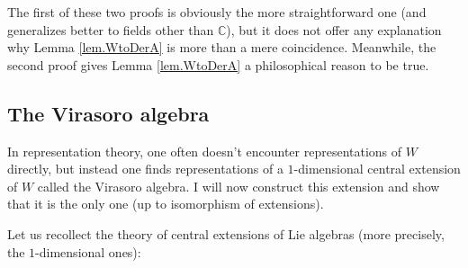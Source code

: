 \documentclass[etingof-lie.tex]{subfiles}
\begin{document}
The first of these two proofs is obviously the more straightforward one (and
generalizes better to fields other than $\mathbb{C}$), but it does not offer
any explanation why Lemma \ref{lem.WtoDerA} is more than a mere coincidence.
Meanwhile, the second proof gives Lemma \ref{lem.WtoDerA} a philosophical
reason to be true.

\subsection{The Virasoro algebra}

In representation theory, one often doesn't encounter representations of $W$
directly, but instead one finds representations of a $1$-dimensional central
extension of $W$ called the Virasoro algebra. I will now construct this
extension and show that it is the only one (up to isomorphism of extensions).

Let us recollect the theory of central extensions of Lie algebras (more
precisely, the $1$-dimensional ones):
\end{document}

